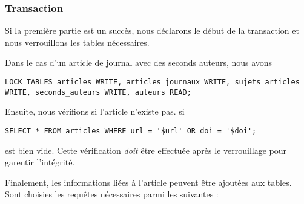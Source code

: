 \documentclass[a4paper, 12pt]{article}
\begin{document}
    \subsubsection{Transaction}
    Si la première partie est un succès, nous déclarons le début de la transaction et nous verrouillons les tables nécessaires.
    
    Dans le cas d'un article de journal avec des seconds auteurs, nous avons
    \begin{lstlisting}[style=sql, gobble=8]
        LOCK TABLES articles WRITE, articles_journaux WRITE, sujets_articles WRITE, seconds_auteurs WRITE, auteurs READ;
    \end{lstlisting}
    Ensuite, nous vérifions si l'article n'existe pas. \Cad{} si
    \begin{lstlisting}[style=sql, gobble=8]
        SELECT * FROM articles WHERE url = '$url' OR doi = '$doi';
    \end{lstlisting}
    est bien vide. Cette vérification \emph{doit} être effectuée après le verrouillage pour garentir l'intégrité. \par
    Finalement, les informations liées à l'article peuvent être ajoutées aux tables. Sont choisies les requêtes nécessaires parmi les suivantes :
\end{document}

